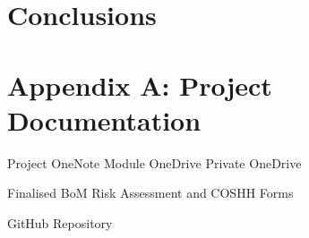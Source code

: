 \documentclass [12pt]{article}
\begin{document}
\newpage
\section{Conclusions}

\newpage



\newpage
\appendix

\section{Appendix A: Project Documentation}

Project OneNote \cite{onenote}
Module OneDrive \cite{unidrive}
Private OneDrive \cite{privdrive}

Finalised BoM \cite{bom}
Risk Assessment and COSHH Forms \cite{RA}

GitHub Repository \cite{}
\end{document}

